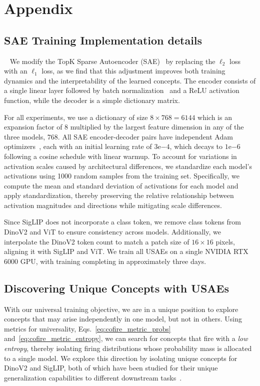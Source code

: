 \newpage
\appendix
\onecolumn
\section{Appendix}

\subsection{SAE Training Implementation details}~\label{appendix:imp_details}
We modify the TopK Sparse Autoencoder (SAE)~\cite{gao2024scaling} by replacing the $\ell_2$ loss with an $\ell_1$ loss, as we find that this adjustment improves both training dynamics and the interpretability of the learned concepts. The encoder consists of a single linear layer followed by batch normalization~\cite{ioffe2015batch} and a ReLU activation function, while the decoder is a simple dictionary matrix.

For all experiments, we use a dictionary of size $8 \times 768 = 6144$ which is an expansion factor of $8$ multiplied by the largest feature dimension in any of the three models, $768$. All SAE encoder-decoder pairs have independent Adam optimizers~\cite{kingma2014adam}, each with an initial learning rate of $3\mathrm{e}{-4}$, which decays to $1\mathrm{e}{-6}$ following a cosine schedule with linear warmup. To account for variations in activation scales caused by architectural differences, we standardize each model's activations using 1000 random samples from the training set. Specifically, we compute the mean and standard deviation of activations for each model and apply standardization, thereby preserving the relative relationship between activation magnitudes and directions while mitigating scale differences.

Since SigLIP does not incorporate a class token, we remove class tokens from DinoV2 and ViT to ensure consistency across models.
Additionally, we interpolate the DinoV2 token count to match a patch size of $16 \times 16$ pixels, aligning it with SigLIP and ViT. We train all USAEs on a single NVIDIA RTX 6000 GPU, with training completing in approximately three days.

\subsection{Discovering Unique Concepts with USAEs}
With our universal training objective, we are in a unique position to explore concepts that may arise independently in one model, but not in others. Using metrics for universality, Eqs.~\ref{eq:cofire_metric_probs} and~\ref{eq:cofire_metric_entropy}, we can search for concepts that fire with a \textit{low entropy}, thereby isolating firing distributions whose probability mass is allocated to a single model. We explore this direction by isolating unique concepts for DinoV2 and SigLIP, both of which have been studied for their unique generalization capabilities to different downstream tasks~\cite{amir2021deep,zhai2023sigmoid}.


